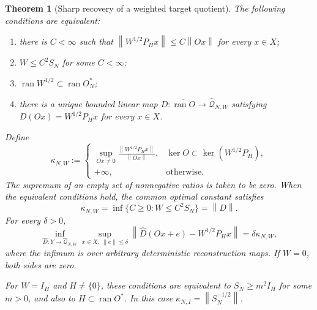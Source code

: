 \documentclass[11pt,a4paper]{amsart}
\numberwithin{equation}{section}
\newtheorem{theorem}{Theorem}[section]
\theoremstyle{definition}
\theoremstyle{remark}
\DeclareMathOperator{\ran}{ran}
\newcommand{\norm}[1]{\left\lVert#1\right\rVert}
\begin{document}
\begin{theorem}[Sharp recovery of a weighted target quotient]\label{thm:target_short}
The following conditions are equivalent:
\begin{enumerate}[label=\textup{(\roman*)}]
\item there is $C<\infty$ such that
$\norm{W^{1/2}P_Hx}\le C\norm{Ox}$ for every $x\in X$;
\item $W\le C^2S_N$ for some $C<\infty$;
\item $\ran W^{1/2}\subset\ran O_N^*$;
\item there is a unique bounded linear map
$D:\overline{\ran O}\to\widehat{\mathcal Q}_{N,W}$ satisfying
$D(Ox)=W^{1/2}P_Hx$ for every $x\in X$.
\end{enumerate}
Define
\begin{equation}\label{eq:target_weight_cost}
 \kappa_{N,W}:=
 \begin{cases}
 \displaystyle\sup_{Ox\ne0}
 \frac{\norm{W^{1/2}P_Hx}}{\norm{Ox}},
 & \ker O\subset\ker(W^{1/2}P_H),\\[2mm]
 +\infty,&\text{otherwise}.
 \end{cases}
\end{equation}
The supremum of an empty set of nonnegative ratios is taken to be zero. When the equivalent conditions hold, the common optimal constant satisfies
\begin{equation}\label{eq:target_weight_cost_equiv}
 \kappa_{N,W}
 =\inf\{C\ge0:W\le C^2S_N\}
 =\norm D.
\end{equation} For every $\delta>0$,
\begin{equation}\label{eq:target_unrestricted_risk}
 \inf_{\widehat D:Y\to\widehat{\mathcal Q}_{N,W}}
 \sup_{x\in X,\ \norm e\le\delta}
 \norm{\widehat D(Ox+e)-W^{1/2}P_Hx}
 =\delta\kappa_{N,W},
\end{equation}
where the infimum is over arbitrary deterministic reconstruction maps. If $W=0$, both sides are zero.

For $W=I_H$ and $H\ne\{0\}$, these conditions are equivalent to
$S_N\ge m^2I_H$ for some $m>0$, and also to $H\subset\ran O^*$. In this case
$\kappa_{N,I}=\norm{S_N^{-1/2}}$.
\end{theorem}
\end{document}
